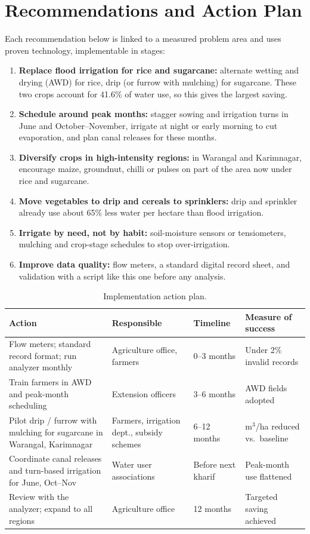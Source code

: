 \documentclass[11pt,a4paper]{article}
\begin{document}
\section{Recommendations and Action Plan}
Each recommendation below is linked to a measured problem area and uses proven
technology, implementable in stages:
\begin{enumerate}
  \item \textbf{Replace flood irrigation for rice and sugarcane:} alternate wetting and
        drying (AWD) for rice, drip (or furrow with mulching) for sugarcane. These two
        crops account for 41.6\% of water use, so this gives the largest saving.
  \item \textbf{Schedule around peak months:} stagger sowing and irrigation turns in
        June and October--November, irrigate at night or early morning to cut
        evaporation, and plan canal releases for these months.
  \item \textbf{Diversify crops in high-intensity regions:} in Warangal and Karimnagar,
        encourage maize, groundnut, chilli or pulses on part of the area now under
        rice and sugarcane.
  \item \textbf{Move vegetables to drip and cereals to sprinklers:} drip and sprinkler
        already use about 65\% less water per hectare than flood irrigation.
  \item \textbf{Irrigate by need, not by habit:} soil-moisture sensors or tensiometers,
        mulching and crop-stage schedules to stop over-irrigation.
  \item \textbf{Improve data quality:} flow meters, a standard digital record sheet,
        and validation with a script like this one before any analysis.
\end{enumerate}

\begin{table}[h]
\centering\small
\caption{Implementation action plan.}
\begin{tabular}{p{4.6cm}p{3.2cm}p{2.2cm}p{3.4cm}}
\toprule
Action & Responsible & Timeline & Measure of success \\
\midrule
Flow meters; standard record format; run analyzer monthly &
  Agriculture office, farmers & 0--3 months & Under 2\% invalid records \\
Train farmers in AWD and peak-month scheduling &
  Extension officers & 3--6 months & AWD fields adopted \\
Pilot drip / furrow with mulching for sugarcane in Warangal, Karimnagar &
  Farmers, irrigation dept., subsidy schemes & 6--12 months &
  m$^3$/ha reduced vs.\ baseline \\
Coordinate canal releases and turn-based irrigation for June, Oct--Nov &
  Water user associations & Before next kharif & Peak-month use flattened \\
Review with the analyzer; expand to all regions &
  Agriculture office & 12 months & Targeted saving achieved \\
\bottomrule
\end{tabular}
\end{table}
\end{document}
